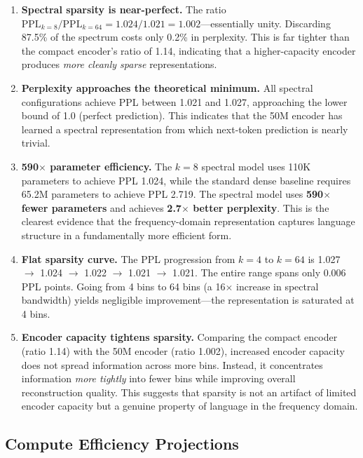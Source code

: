 \documentclass[10pt,twocolumn]{article}
\begin{document}
\begin{enumerate}[leftmargin=*,nosep]
    \item \textbf{Spectral sparsity is near-perfect.} The ratio $\text{PPL}_{k=8} / \text{PPL}_{k=64} = 1.024 / 1.021 = 1.002$---essentially unity. Discarding 87.5\% of the spectrum costs only 0.2\% in perplexity. This is far tighter than the compact encoder's ratio of 1.14, indicating that a higher-capacity encoder produces \emph{more cleanly sparse} representations.

    \item \textbf{Perplexity approaches the theoretical minimum.} All spectral configurations achieve PPL between 1.021 and 1.027, approaching the lower bound of 1.0 (perfect prediction). This indicates that the 50M encoder has learned a spectral representation from which next-token prediction is nearly trivial.

    \item \textbf{590$\times$ parameter efficiency.} The $k = 8$ spectral model uses 110K parameters to achieve PPL 1.024, while the standard dense baseline requires 65.2M parameters to achieve PPL 2.719. The spectral model uses \textbf{590$\times$ fewer parameters} and achieves \textbf{2.7$\times$ better perplexity}. This is the clearest evidence that the frequency-domain representation captures language structure in a fundamentally more efficient form.

    \item \textbf{Flat sparsity curve.} The PPL progression from $k = 4$ to $k = 64$ is 1.027 $\rightarrow$ 1.024 $\rightarrow$ 1.022 $\rightarrow$ 1.021 $\rightarrow$ 1.021. The entire range spans only 0.006 PPL points. Going from 4 bins to 64 bins (a 16$\times$ increase in spectral bandwidth) yields negligible improvement---the representation is saturated at 4 bins.

    \item \textbf{Encoder capacity tightens sparsity.} Comparing the compact encoder (ratio 1.14) with the 50M encoder (ratio 1.002), increased encoder capacity does not spread information across more bins. Instead, it concentrates information \emph{more tightly} into fewer bins while improving overall reconstruction quality. This suggests that sparsity is not an artifact of limited encoder capacity but a genuine property of language in the frequency domain.
\end{enumerate}

\subsection{Compute Efficiency Projections}
\end{document}
